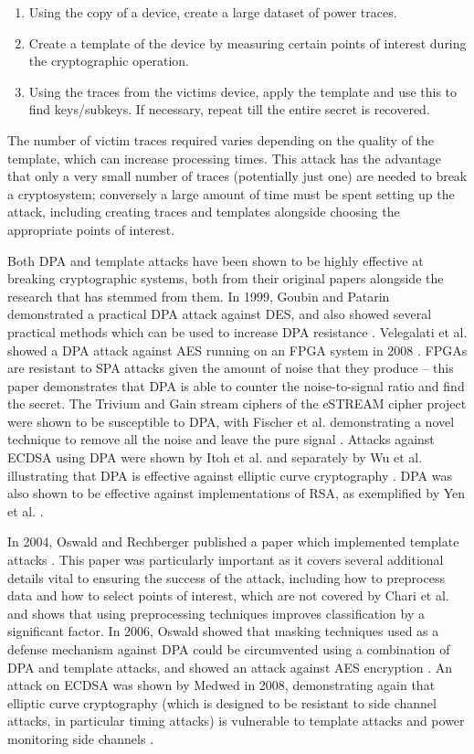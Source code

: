 \documentclass[a4paper,oneside,11pt]{article}
\begin{document}
\begin{enumerate}
	\item{Using the copy of a device, create a large dataset of power
		traces.}
	\item{Create a template of the device by measuring certain points of
		interest during the cryptographic operation.}
	\item{Using the traces from the victims device, apply the template and
		use this to find keys/subkeys. If necessary, repeat till the
		entire secret is recovered.}
\end{enumerate}

The number of victim traces required varies depending on the quality of the
template, which can increase processing times. This attack has the advantage
that only a very small number of traces (potentially just one) are needed to
break a cryptosystem; conversely a large amount of time must be spent setting
up the attack, including creating traces and templates alongside choosing the
appropriate points of interest.

Both DPA and template attacks have been shown to be highly effective at
breaking cryptographic systems, both from their original papers alongside the
research that has stemmed from them. In 1999, Goubin and Patarin demonstrated a
practical DPA attack against DES, and also showed several practical methods
which can be used to increase DPA resistance \cite{A/Goubin-1999-DPA}.
Velegalati et al. showed a DPA attack against AES running on an FPGA system in
2008 \cite{A/Velegalati-2008-DPA}. FPGAs are resistant to SPA attacks given the
amount of noise that they produce -- this paper demonstrates that DPA is able
to counter the noise-to-signal ratio and find the secret. The Trivium and Gain
stream ciphers of the eSTREAM cipher project were shown to be susceptible to
DPA, with Fischer et al. demonstrating a novel technique to remove all the
noise and leave the pure signal \cite{A/Fishcer-2006-DPA}. Attacks against
ECDSA using DPA were shown by Itoh et al. and separately by Wu et al.
illustrating that DPA is effective against elliptic curve cryptography
\cite{A/Itoh-2003-DPA, A/Wu-2009-DPA}. DPA was also shown to be effective
against implementations of RSA, as exemplified by Yen et al.
\cite{A/Yen-2005-DPA}.

In 2004, Oswald and Rechberger published a paper which implemented template
attacks \cite{A/Oswald-2004-Template}. This paper was particularly important as
it covers several additional details vital to ensuring the success of the
attack, including how to preprocess data and how to select points of interest,
which are not covered by Chari et al. and shows that using preprocessing
techniques improves classification by a significant factor. In 2006, Oswald
showed that masking techniques used as a defense mechanism against DPA could be
circumvented using a combination of DPA and template attacks, and showed an
attack against AES encryption \cite{A/Oswald-2007-Template}. An attack on ECDSA
was shown by Medwed in 2008, demonstrating again that elliptic curve
cryptography (which is designed to be resistant to side channel attacks, in
particular timing attacks) is vulnerable to template attacks and power
monitoring side channels \cite{A/Medwed-2008-Template}.
\end{document}
